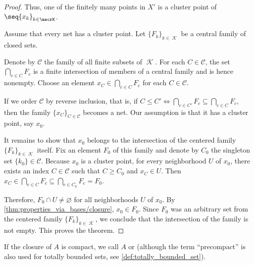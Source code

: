 \begin{proof}
  Thus, one of the finitely many points in \( X' \) is a cluster point of \( \seq{ x_k }_{k \in \mscrK} \).

   Assume that every net has a cluster point. Let \( \{ F_k \}_{k \in \mscrK} \) be a central family of closed sets.

  Denote by \( \mathcal C \) the family of all finite subsets of \( \mscrK \). For each \( C \in \mathcal C \), the set \( \bigcap_{c \in C} F_c \) is a finite intersection of members of a central family and is hence nonempty. Choose an element \( x_C \in \bigcap_{c \in C} F_c \) for each \( C \in \mathcal C \).

  If we order \( \mathcal C \) by reverse inclusion, that is, if \( C \leq C' \iff \bigcap_{c \in C'} F_c \subseteq \bigcap_{c \in C} F_c \), then the family \( \{ x_C \}_{C \in \mathcal C} \) becomes a net. Our assumption is that it has a cluster point, say \( x_0 \).

  It remains to show that \( x_0 \) belongs to the intersection of the centered family \( \{ F_k \}_{k \in \mscrK} \) itself. Fix an element \( F_0 \) of this family and denote by \( C_0 \) the singleton set \( \{ k_0 \} \in \mathcal C \). Because \( x_0 \) is a cluster point, for every neighborhood \( U \) of \( x_0 \), there exists an index \( C \in \mathcal C \) such that \( C \geq C_0 \) and \( x_C \in U \). Then \( x_C \in \bigcap_{c \in C} F_c \subseteq \bigcap_{c \in C_0} F_c = F_0 \).

  Therefore, \( F_0 \cap U \neq \varnothing \) for all neighborhoods \( U \) of \( x_0 \). By \cref{thm:properties_via_bases/closure}, \( x_0 \in F_0 \). Since \( F_0 \) was an arbitrary set from the centered family \( \{ F_k \}_{k \in \mscrK} \), we conclude that the intersection of the family is not empty. This proves the theorem.
\end{proof}

\begin{remark}\label{rem:precompact_set}
  If the closure of \( A \) is compact, we call \( A \)  or  (although the term \enquote{precompact} is also used for totally bounded sets, see \cref{def:totally_bounded_set}).
\end{remark}


